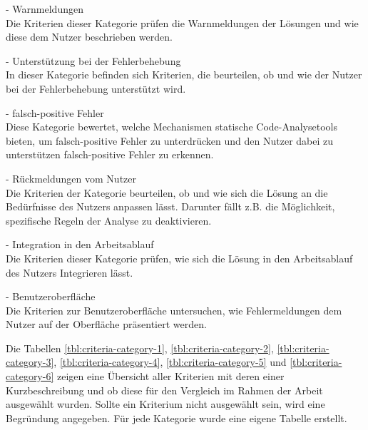 \begin{description}
    \setlength\itemsep{-0.5cm}
    \item[Kategorie 1]{- Warnmeldungen\\}
          Die Kriterien dieser Kategorie prüfen die Warnmeldungen der Lösungen und wie diese dem Nutzer beschrieben werden.
    \item[Kategorie 2]{- Unterstützung bei der Fehlerbehebung\\}
          In dieser Kategorie befinden sich Kriterien, die beurteilen, ob und wie der Nutzer bei der Fehlerbehebung unterstützt wird.
    \item[Kategorie 3]{- falsch-positive Fehler\\}
          Diese Kategorie bewertet, welche Mechanismen statische Code-Analysetools bieten, um falsch-positive Fehler zu unterdrücken
          und den Nutzer dabei zu unterstützen falsch-positive Fehler zu erkennen.
    \item[Kategorie 4]{- Rückmeldungen vom Nutzer\\}
          Die Kriterien der Kategorie beurteilen, ob und wie sich die Lösung an die Bedürfnisse des Nutzers anpassen lässt.
          Darunter fällt z.B. die Möglichkeit, spezifische Regeln der Analyse zu deaktivieren.
    \item[Kategorie 5]{- Integration in den Arbeitsablauf\\}
          Die Kriterien dieser Kategorie prüfen, wie sich die Lösung in den Arbeitsablauf des Nutzers Integrieren lässt.
    \item[Kategorie 6]{- Benutzeroberfläche\\}
          Die Kriterien zur Benutzeroberfläche untersuchen, wie Fehlermeldungen dem Nutzer auf der Oberfläche präsentiert werden.
\end{description}

Die Tabellen \ref{tbl:criteria-category-1}, \ref{tbl:criteria-category-2}, \ref{tbl:criteria-category-3}, \ref{tbl:criteria-category-4}, \ref{tbl:criteria-category-5}  und \ref{tbl:criteria-category-6}
zeigen eine Übersicht aller Kriterien mit deren einer Kurzbeschreibung und ob diese für den Vergleich im Rahmen der Arbeit ausgewählt wurden.
Sollte ein Kriterium nicht ausgewählt sein, wird eine Begründung angegeben. Für jede Kategorie wurde eine eigene Tabelle erstellt.

